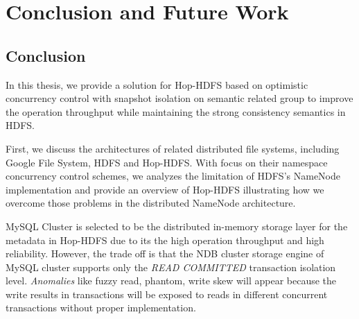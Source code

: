 
%
%


\chapter{Conclusion and Future Work}
\label{ch:conclusion}

%




\section{Conclusion}

In this thesis, we provide a solution for Hop-HDFS based on optimistic concurrency control with snapshot isolation on semantic related group to improve the operation throughput while maintaining the strong consistency semantics in HDFS.

\noindent First, we discuss the architectures of related distributed file systems, including Google File System, HDFS and Hop-HDFS. With focus on their namespace concurrency control schemes, we analyzes the limitation of HDFS's NameNode implementation and provide an overview of Hop-HDFS illustrating how we overcome those problems in the distributed NameNode architecture.

\noindent MySQL Cluster is selected to be the distributed in-memory storage layer for the metadata in Hop-HDFS due to its the high operation throughput and high reliability. However, the trade off is that the NDB cluster storage engine  of MySQL cluster supports only the \textit{READ COMMITTED} transaction isolation level. \textit{Anomalies} like fuzzy read, phantom, write skew will appear because the write results in transactions will be exposed to reads in different concurrent transactions without proper implementation.

